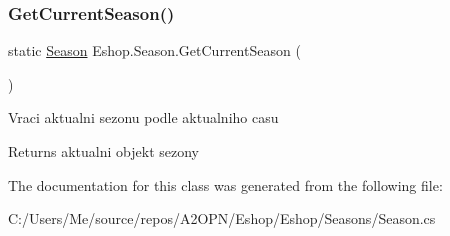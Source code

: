 \subsubsection{\texorpdfstring{GetCurrentSeason()}{GetCurrentSeason()}}
{\footnotesize\ttfamily static \mbox{\hyperlink{class_eshop_1_1_season}{Season}} Eshop.\+Season.\+Get\+Current\+Season (\begin{DoxyParamCaption}{ }\end{DoxyParamCaption})\hspace{0.3cm}{\ttfamily [static]}}



Vraci aktualni sezonu podle aktualniho casu 

\begin{DoxyReturn}{Returns}
aktualni objekt sezony
\end{DoxyReturn}


The documentation for this class was generated from the following file\+:\begin{DoxyCompactItemize}
\item 
C\+:/\+Users/\+Me/source/repos/\+A2\+O\+P\+N/\+Eshop/\+Eshop/\+Seasons/Season.\+cs\end{DoxyCompactItemize}
